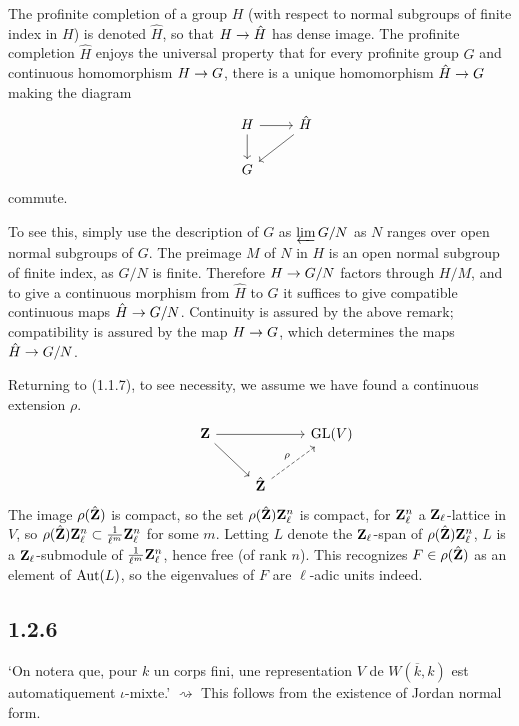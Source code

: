 \documentclass[deligne.tex]{subfiles}
\begin{document}
The profinite completion of a group $H$ (with respect to normal subgroups
of finite index in $H$) is denoted $\hat H$, so that $H\rightarrow\hat H$ has dense
image. The profinite completion $\hat H$ enjoys the universal property that
for every profinite group $G$ and continuous homomorphism $H\rightarrow G$,
there is a unique homomorphism $\hat H\rightarrow G$ making the diagram
\begin{equation*}
\begin{tikzcd}
	&H\arrow[r]\arrow[d]&\hat H\arrow[dl] \\	&G
\end{tikzcd}
\end{equation*}
commute.

To see this, simply use the description of $G$ as $\varprojlim G/N$ as
$N$ ranges over open normal subgroups of $G$. The preimage $M$ of $N$ in $H$
is an open normal subgroup of finite index, as $G/N$ is finite.
Therefore $H\rightarrow G/N$ factors through $H/M$, and to give a continuous
morphism from $\hat H$ to $G$ it suffices to give compatible continuous maps
$\hat H\rightarrow G/N$. Continuity is assured by the above remark; compatibility is
assured by the map $H\rightarrow G$, which determines the maps $\hat H\rightarrow G/N$.

Returning to (1.1.7), to see necessity, we assume we have found a continuous 
extension $\rho$.
\begin{equation*}
\begin{tikzcd}
	&\ZZ\arrow[rr]\arrow[dr]&&\GL(V) \\
	&&\hat\ZZ\arrow[ur,dashed,"\rho"]
\end{tikzcd}	
\end{equation*}
The image $\rho(\hat{\mathbf{Z}})$ is compact, so the set $\rho(\hat{\mathbf{Z}})\mathbf{Z}_\ell^n$
is compact, for $\mathbf{Z}_\ell^n$ a $\mathbf{Z}_\ell$-lattice in $V$, so 
$\rho(\hat{\mathbf{Z}})\mathbf{Z}_\ell^n\subset\frac1{\ell^m}\mathbf{Z}_\ell^n$ for some $m$.
Letting $L$ denote the $\mathbf{Z}_\ell$-span of $\rho(\hat{\mathbf{Z}})\mathbf{Z}_\ell^n$, $L$ is 
a $\mathbf{Z}_\ell$-submodule of $\frac1{\ell^m}\mathbf{Z}_\ell^n$, hence free
(of rank $n$). This recognizes $F\in\rho(\hat{\mathbf{Z}})$ as an element of
$\operatorname{Aut}(L)$, so the eigenvalues of $F$ are $\ell$-adic units indeed.


\subsection*{1.2.6} `On notera que, pour $k$ un corps fini,
une representation $V$ de $W(\overline k,k)$ est
automatiquement $\iota$-mixte.’ $\rightsquigarrow$
This follows from the existence of Jordan normal form.
\end{document}
